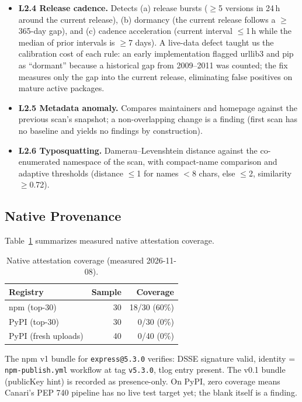 \documentclass[11pt,a4paper]{article}
\begin{document}
\begin{itemize}[leftmargin=1.5em]
\item \textbf{L2.4 Release cadence.} Detects (a) release bursts ($\ge$5
versions in 24\,h around the current release), (b) dormancy (the current
release follows a $\ge$365-day gap), and (c) cadence acceleration (current
interval $\le$1\,h while the median of prior intervals is $\ge$7 days).
A live-data defect taught us the calibration cost of each rule: an early
implementation flagged urllib3 and pip as ``dormant'' because a historical
gap from 2009--2011 was counted; the fix measures only the gap into the
current release, eliminating false positives on mature active packages.
\item \textbf{L2.5 Metadata anomaly.} Compares maintainers and homepage
against the previous scan's snapshot; a non-overlapping change is a finding
(first scan has no baseline and yields no findings by construction).
\item \textbf{L2.6 Typosquatting.} Damerau--Levenshtein distance against the
co-enumerated namespace of the scan, with compact-name comparison and
adaptive thresholds (distance $\le$1 for names $<$8 chars, else $\le$2,
similarity $\ge$0.72).
\end{itemize}

\subsection{Native Provenance}

Table~\ref{tab:native} summarizes measured native attestation coverage.

\begin{table}[h]
\centering
\caption{Native attestation coverage (measured 2026-11-08).}
\label{tab:native}
\begin{tabular}{lrr}
\toprule
Registry & Sample & Coverage \\
\midrule
npm (top-30) & 30 & 18/30 (60\%) \\
PyPI (top-30) & 30 & 0/30 (0\%) \\
PyPI (fresh uploads) & 40 & 0/40 (0\%) \\
\bottomrule
\end{tabular}
\end{table}

The npm v1 bundle for \texttt{express@5.3.0} verifies: DSSE signature valid,
identity = \texttt{npm-publish.yml} workflow at tag \texttt{v5.3.0},
tlog entry present. The v0.1 bundle (publicKey hint) is recorded as
presence-only. On PyPI, zero coverage means Canari's PEP 740 pipeline has no
live test target yet; the blank itself is a finding.
\end{document}
